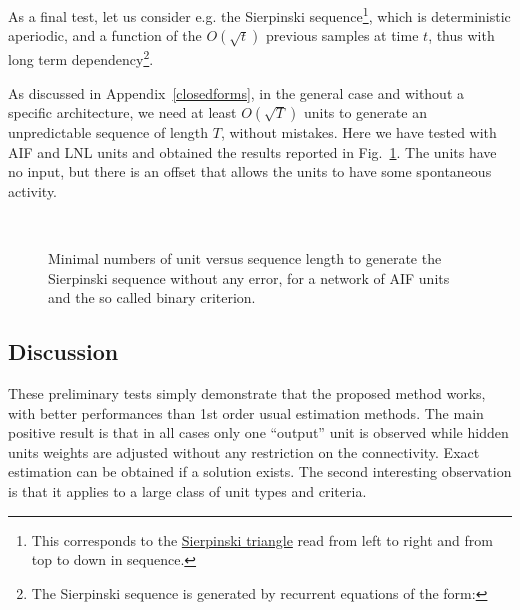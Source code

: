 As a final test, let us consider e.g. the Sierpinski sequence\footnote{This corresponds to the \href{https://en.wikipedia.org/wiki/Sierpinski_triangle}{Sierpinski triangle} read from left to right and from top to down in sequence.}, which is deterministic aperiodic, and a function of the $O(\sqrt{t})$ previous samples at time $t$, thus with long term dependency\footnote{The Sierpinski sequence is generated by recurrent equations of the form:
}.

As discussed in Appendix~\ref{closedforms}, in the general case and without a specific architecture, we need at least $O(\sqrt{T})$ units to generate an unpredictable sequence of length $T$, without mistakes. Here we have tested with AIF and LNL units and obtained the results reported in Fig.~\ref{sequence-generation}. The units have no input, but there is an offset that allows the units to have some spontaneous activity.

\begin{figure}[!ht]
  \begin{center}{\small 
     \\
  }\end{center}
  \caption{Minimal numbers of unit versus sequence length to generate the Sierpinski sequence without any error, for a network of AIF units and the so called binary criterion.}
  \label{sequence-generation}
\end{figure}

\subsection*{Discussion}

These preliminary tests simply demonstrate that the proposed method works, with better performances than 1st order usual estimation methods. The main positive result is that in all cases only one ``output'' unit is observed while hidden units weights are adjusted without any restriction on the connectivity. Exact estimation can be obtained if a solution exists. The second interesting observation is that it applies to a large class of unit types and criteria. 

